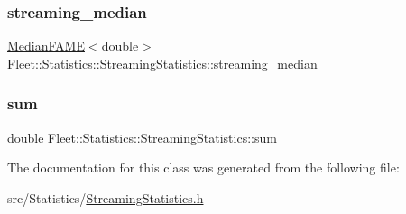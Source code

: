 \subsubsection{\texorpdfstring{streaming\+\_\+median}{streaming\_median}}
{\footnotesize\ttfamily \hyperlink{class_fleet_1_1_statistics_1_1_median_f_a_m_e}{Median\+F\+A\+ME}$<$double$>$ Fleet\+::\+Statistics\+::\+Streaming\+Statistics\+::streaming\+\_\+median}

\mbox{\label{class_fleet_1_1_statistics_1_1_streaming_statistics_ab635c93398bfd1cc8c0c65b012d87d83}} 
\subsubsection{\texorpdfstring{sum}{sum}}
{\footnotesize\ttfamily double Fleet\+::\+Statistics\+::\+Streaming\+Statistics\+::sum}



The documentation for this class was generated from the following file\+:\begin{DoxyCompactItemize}
\item 
src/\+Statistics/\hyperlink{_streaming_statistics_8h}{Streaming\+Statistics.\+h}\end{DoxyCompactItemize}
